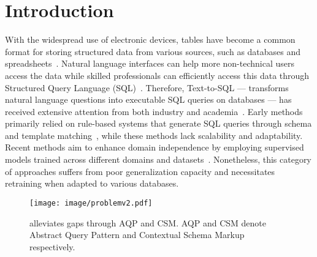 \section{Introduction}
With the widespread use of electronic devices, tables have become a common format for storing structured data from various sources, such as databases and spreadsheets~\citep{lu2024large}.
Natural language interfaces can help more non-technical users access the data while skilled professionals can efficiently access this data through Structured Query Language (SQL)~\citep{codd1974seven, deng2022recent,qin2022survey}.
Therefore, Text-to-SQL --- transforms natural language questions into executable SQL queries on databases --- has received extensive attention from both industry and academia~\citep{deng2022recent,qin2022survey,katsogiannis2023survey}.
Early methods primarily relied on rule-based systems that generate SQL queries through schema and template matching~\citep{androutsopoulos1995natural,zelle1996learning}, while these methods lack scalability and adaptability.
Recent methods aim to enhance domain independence by employing supervised models trained across different domains and datasets~\citep{scholak2021picard,qi2022rasat}. Nonetheless, this category of approaches suffers from poor generalization capacity and necessitates retraining when adapted to various databases. 

\begin{figure}[tbp]
    \centering
    \texttt{[image: image/problemv2.pdf]}
    \caption{\model alleviates gaps through AQP and CSM. AQP and CSM denote Abstract Query Pattern and Contextual Schema Markup respectively.}
    \label{fig:enter-label}
    \vspace{-6mm}
\end{figure}

